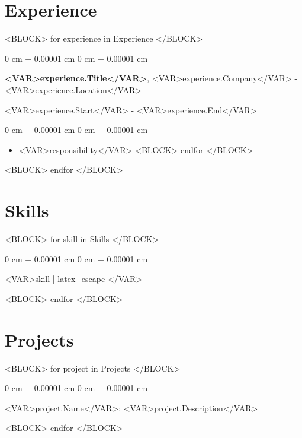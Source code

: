 \documentclass[10pt, letterpaper]{article}
\newenvironment{highlights}{
    \begin{itemize}[
        topsep=0.10 cm,
        parsep=0.10 cm,
        partopsep=0pt,
        itemsep=0pt,
        leftmargin=0 cm + 10pt
    ]
}{
    \end{itemize}
} %
\newenvironment{onecolentry}{
    \begin{adjustwidth}{
        0 cm + 0.00001 cm
    }{
        0 cm + 0.00001 cm
    }
}{
    \end{adjustwidth}
} %
\newenvironment{twocolentry}[2][]{
    \onecolentry
    \def\secondColumn{#2}
    \setcolumnwidth{\fill, 4.5 cm}
    \begin{paracol}{2}
}{
    \switchcolumn \raggedleft \secondColumn
    \end{paracol}
    \endonecolentry
} %
\begin{document}
    \section{Experience}
    <BLOCK> for experience in Experience </BLOCK>
    \begin{twocolentry}{<VAR>experience.Start</VAR> - <VAR>experience.End</VAR>}
        \textbf{<VAR>experience.Title</VAR>}, <VAR>experience.Company</VAR> - <VAR>experience.Location</VAR>
    \end{twocolentry}
    \vspace{0.10 cm}
    \begin{onecolentry}
        \begin{highlights}
        <BLOCK> for responsibility in experience.Responsibilities </BLOCK>
            \item <VAR>responsibility</VAR>
        <BLOCK> endfor </BLOCK>
        \end{highlights}
    \end{onecolentry}
    \vspace{0.2 cm}
    <BLOCK> endfor </BLOCK>

    \vspace{0.2 cm}

    \section{Skills}
    <BLOCK> for skill in Skills </BLOCK>
        \begin{onecolentry}
            <VAR>skill | latex_escape </VAR>
        \end{onecolentry}
        \vspace{0.2 cm}
    <BLOCK> endfor </BLOCK>
    
    \section{Projects}
    <BLOCK> for project in Projects </BLOCK>
        \begin{onecolentry}
            <VAR>project.Name</VAR>: <VAR>project.Description</VAR>
        \end{onecolentry}
        \vspace{0.2 cm}
    <BLOCK> endfor </BLOCK>
\end{document}
